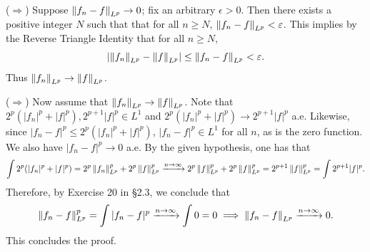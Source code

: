 \documentclass{article}
\begin{document}
	($\Longrightarrow$) Suppose $\left\Vert f_{n} - f \right\Vert_{L^{p}} \to 0$; fix an arbitrary $\epsilon > 0$. Then there exists a positive integer $N$ such that that for all $n \geq N$, $\left\Vert f_{n} - f \right\Vert_{L^{p}} < \varepsilon$. This implies by the Reverse Triangle Identity that for all $n \geq N$,
	\begin{equation*}
		\left| \left\Vert f_{n} \right\Vert_{L^{p}} - \left\Vert f \right\Vert_{L^{p}} \right| \leq \left\Vert f_{n} - f \right\Vert_{L^{p}} < \varepsilon. 
	\end{equation*}
	Thus $\left\Vert f_{n} \right\Vert_{L^{p}} \to \left\Vert f \right\Vert_{L^{p}}$. 
	
	($\Longrightarrow$) Now assume that $\left\Vert f_{n} \right\Vert_{L^{p}} \to \left\Vert f \right\Vert_{L^{p}}$. Note that $2^{p}(|f_{n}|^{p} + |f|^{p}), 2^{p + 1}|f|^{p} \in L^{1}$ and $2^{p}(|f_{n}|^{p} + |f|^{p}) \to 2^{p + 1}|f|^{p}$ a.e. Likewise, since $|f_{n} - f|^{p} \leq 2^{p}(|f_{n}|^{p} + |f|^{p})$, $|f_{n} - f|^{p} \in L^{1}$ for all $n$, as is the zero function. We also have $|f_{n} -f|^{p} \to 0$ a.e. By the given hypothesis, one has that 
	\begin{equation*}
		\int 2^{p}(|f_{n}|^{p} + |f|^{p}) = 2^{p}\left\Vert f_{n} \right\Vert_{L^{p}}^{p} + 2^{p}\left\Vert f \right\Vert_{L^{p}}^{p} \xrightarrow{n \to \infty}2^{p}\left\Vert f \right\Vert_{L^{p}}^{p} + 2^{p}\left\Vert f \right\Vert_{L^{p}}^{p} = 2^{p + 1}\left\Vert f \right\Vert_{L^{p}}^{p} = \int 2^{p + 1}|f|^{p}. 
	\end{equation*}
	Therefore, by Exercise 20 in \S 2.3, we conclude that 
	\begin{equation*}
		\left\Vert f_{n} - f \right\Vert_{L^{p}}^{p} = \int |f_{n} - f|^{p} \xrightarrow{n \to \infty} \int 0 = 0 \implies \left\Vert f_{n} - f \right\Vert_{L^{p}} \xrightarrow{n \to \infty} 0. 
	\end{equation*}
	This concludes the proof. 
	
\end{document}
